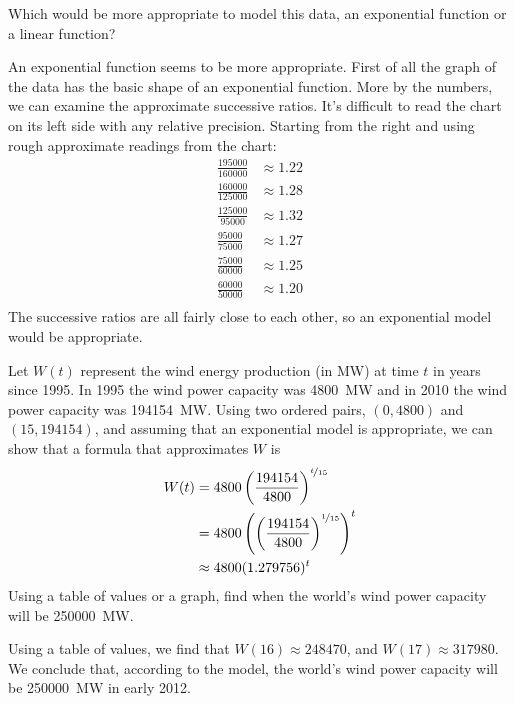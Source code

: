 \begin{problem}
\begin{subproblem}
	Which would be more appropriate to model this data, an exponential function or a linear function?
	\begin{shortsolution}
		An exponential function seems to be more appropriate.  First of all the graph of the data has the basic shape of an exponential function.  More by the numbers, we can examine the approximate successive ratios.  It's difficult to read the chart on its left side with any relative precision.  Starting from the right and using rough approximate readings from the chart:
		\setlength\jot{10pt}	%
		\begin{align*}
			\frac{195000}{160000} & \approx 1.22 \\
			\frac{160000}{125000} & \approx 1.28 \\
			\frac{125000}{95000}  & \approx 1.32 \\
			\frac{95000}{75000}   & \approx 1.27 \\
			\frac{75000}{60000}   & \approx 1.25 \\
			\frac{60000}{50000}   & \approx 1.20 \\
		\end{align*}
		The successive ratios are all fairly close to each other, so an exponential model would be appropriate.    
	\end{shortsolution}
\end{subproblem}
\begin{subproblem}
	Let $W(t)$ represent the wind energy production (in \si{\mega\watt}) at time $t$ in 
	years since 1995. 
	In 1995 the wind power capacity was \SI{4800}{\mega\watt} and in 2010 the wind power capacity was \SI{194154}{\mega\watt}.
	Using two ordered pairs, $(0,4800)$ and $(15,194154)$, and assuming that an exponential model is appropriate, we can 
	show that a formula that approximates $W$ is
	\begin{align*}
		W(t) & =      4800\left( \frac{194154}{4800} \right)^{\nicefrac{t}{15}}                  \\
		     & =      4800\left( \left( \frac{194154}{4800} \right)^{\nicefrac{1}{15}} \right)^t \\
		     & \approx 4800(1.279756)^t                                                          
	\end{align*}
	Using a table of values or a graph, find when the world's wind power capacity will be \SI{250000}{\mega\watt}.
	\begin{shortsolution}
		Using a table of values, we find that $W(16)\approx 248470$, and $W(17)\approx 317980$. We conclude that, 
		according to the model, the world's wind power capacity will be \SI{250000}{\mega\watt} in early 2012. 
	\end{shortsolution}
\end{subproblem}
\end{problem}
			
